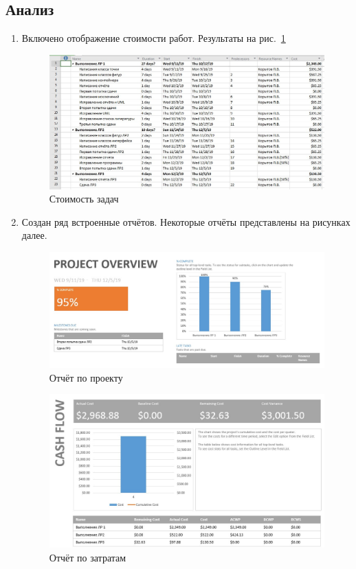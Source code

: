 \documentclass[a4paper, 14pt]{extarticle}
\begin{document}
\subsection{Анализ}
\begin{enumerate}
    \item Включено отображение стоимости работ. Результаты на рис.~\ref{img:cost}
    \begin{figure}[h]
        \centering
        \includegraphics[width=\textwidth]{img/S006.jpg}
        \caption{Стоимость задач}%
        \label{img:cost}
    \end{figure}
    \FloatBarrier{}
    \item Создан ряд встроенные отчётов. Некоторые отчёты представлены на рисунках далее.
    \begin{figure}[h]
        \centering
        \includegraphics[width=\textwidth]{img/S007.jpg}
        \caption{Отчёт по проекту}%
        \label{img:report:project}
    \end{figure}
    
    \begin{figure}[h]
        \centering
        \includegraphics[width=\textwidth]{img/S008.jpg}
        \caption{Отчёт по затратам}%
        \label{img:report:cost}
    \end{figure}
    

\end{enumerate}
\end{document}
